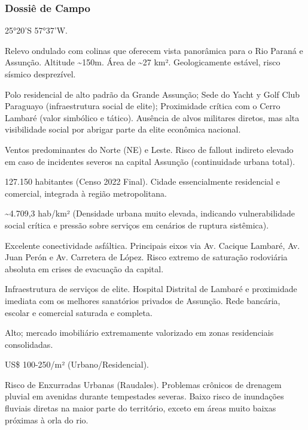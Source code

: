 \subsubsection{Dossiê de Campo}
\begin{description}[style=nextline,leftmargin=0.5cm,font=\bfseries]
\item[Coordenadas]  25°20'S 57°37'W.
\item[Topografia]  Relevo ondulado com colinas que oferecem vista panorâmica para o Rio Paraná e Assunção. Altitude \textasciitilde 150m. Área de \textasciitilde 27 km². Geologicamente estável, risco sísmico desprezível.
\item[Alvos Estratégicos]  Polo residencial de alto padrão da Grande Assunção; Sede do Yacht y Golf Club Paraguayo (infraestrutura social de elite); Proximidade crítica com o Cerro Lambaré (valor simbólico e tático). Ausência de alvos militares diretos, mas alta visibilidade social por abrigar parte da elite econômica nacional.
\item[Fallout]  Ventos predominantes do Norte (NE) e Leste. Risco de fallout indireto elevado em caso de incidentes severos na capital Assunção (continuidade urbana total).
\item[População]  127.150 habitantes (Censo 2022 Final). Cidade essencialmente residencial e comercial, integrada à região metropolitana.
\item[Densidade]  \textasciitilde 4.709,3 hab/\allowbreak km² (Densidade urbana muito elevada, indicando vulnerabilidade social crítica e pressão sobre serviços em cenários de ruptura sistêmica).
\item[Vias de Acesso]  Excelente conectividade asfáltica. Principais eixos via Av. Cacique Lambaré, Av. Juan Perón e Av. Carretera de López. Risco extremo de saturação rodoviária absoluta em crises de evacuação da capital.
\item[Serviços]  Infraestrutura de serviços de elite. Hospital Distrital de Lambaré e proximidade imediata com os melhores sanatórios privados de Assunção. Rede bancária, escolar e comercial saturada e completa.
\item[Custo de Vida]  Alto; mercado imobiliário extremamente valorizado em zonas residenciais consolidadas.
\item[Preço da Terra]  US\$ 100-250/\allowbreak m² (Urbano/\allowbreak Residencial).
\item[Hidrologia]  Risco de Enxurradas Urbanas (Raudales). Problemas crônicos de drenagem pluvial em avenidas durante tempestades severas. Baixo risco de inundações fluviais diretas na maior parte do território, exceto em áreas muito baixas próximas à orla do rio.

\end{description}
